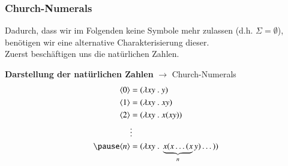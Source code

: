 \documentclass[aspectratio=1610,onlymath, ngerman]{beamer}
\renewcommand{\emph}[1]{\textbf{#1}}
\newcommand{\coloremph}[1]{\textcolor{cdpurple}{#1}}
\newcommand{\num}[1]{\ensuremath{\langle #1 \rangle}}
\begin{document}
	\begin{frame} \frametitle{Church-Numerals}
		\small
		Dadurch, dass wir im Folgenden keine Symbole mehr zulassen (d.h. $\Sigma = \emptyset$), benötigen wir eine alternative Charakterisierung dieser. \\
		Zuerst beschäftigen uns die natürlichen Zahlen. \\
		
		\medskip \pause
		 
		\emph{Darstellung der natürlichen Zahlen} $\rightarrow$ \coloremph{Church-Numerals} \\
		\begin{align*}
			\num{0} &= (\lambda xy \ . \ y) \\ 
			\num{1} &= (\lambda xy \ . \ xy) \\
			\num{2} &= (\lambda xy \ . \ x(xy)) \\
			&\vdots \\ \pause
			\num{n} &= (\lambda xy \ . \ \underbrace{x (x \dots (x}_n y ) \dots ))
		\end{align*}
		
	\end{frame}
\end{document}
